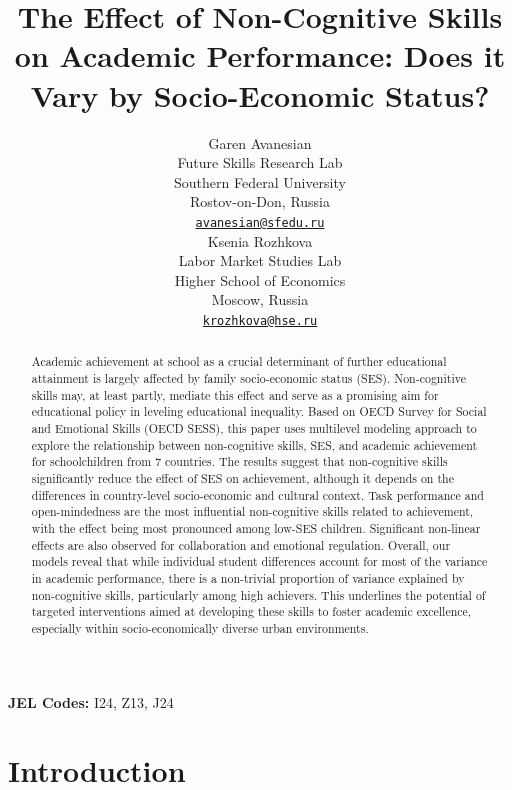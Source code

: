 \documentclass{article}
\title{The Effect of Non-Cognitive Skills on Academic Performance: Does
it Vary by Socio-Economic Status?}
\author{
    Garen Avanesian
   \\
    Future Skills Research Lab \\
    Southern Federal University \\
  Rostov-on-Don, Russia \\
  \texttt{\href{mailto:avanesian@sfedu.ru}{\nolinkurl{avanesian@sfedu.ru}}} \\
   \And
    Ksenia Rozhkova
   \\
    Labor Market Studies Lab \\
    Higher School of Economics \\
  Moscow, Russia \\
  \texttt{\href{mailto:krozhkova@hse.ru}{\nolinkurl{krozhkova@hse.ru}}} \\
  }
\begin{document}
\maketitle


\begin{abstract}
Academic achievement at school as a crucial determinant of further
educational attainment is largely affected by family socio-economic
status (SES). Non-cognitive skills may, at least partly, mediate this
effect and serve as a promising aim for educational policy in leveling
educational inequality. Based on OECD Survey for Social and Emotional
Skills (OECD SESS), this paper uses multilevel modeling approach to
explore the relationship between non-cognitive skills, SES, and academic
achievement for schoolchildren from 7 countries. The results suggest
that non-cognitive skills significantly reduce the effect of SES on
achievement, although it depends on the differences in country-level
socio-economic and cultural context. Task performance and
open-mindedness are the most influential non-cognitive skills related to
achievement, with the effect being most pronounced among low-SES
children. Significant non-linear effects are also observed for
collaboration and emotional regulation. Overall, our models reveal that
while individual student differences account for most of the variance in
academic performance, there is a non-trivial proportion of variance
explained by non-cognitive skills, particularly among high achievers.
This underlines the potential of targeted interventions aimed at
developing these skills to foster academic excellence, especially within
socio-economically diverse urban environments.
\end{abstract}


\textbf{JEL Codes:} I24, Z13, J24

\newpage

\hypertarget{introduction}{%
\section{Introduction}\label{introduction}}
\end{document}
